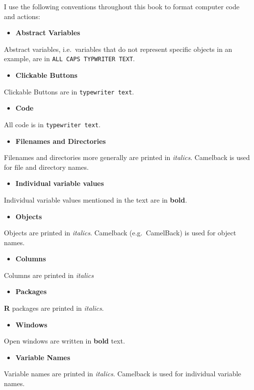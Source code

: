 I use the following conventions throughout this book to format computer
code and actions:

\begin{itemize}
\item
  \textbf{Abstract Variables}
\end{itemize}
Abstract variables, i.e.~variables that do not represent specific
objects in an example, are in \texttt{ALL CAPS TYPWRITER TEXT}.

\begin{itemize}
\item
  \textbf{Clickable Buttons}
\end{itemize}
Clickable Buttons are in \texttt{typewriter text}.

\begin{itemize}
\item
  \textbf{Code}
\end{itemize}
All code is in \texttt{typewriter text}.

\begin{itemize}
\item
  \textbf{Filenames and Directories}
\end{itemize}
Filenames and directories more generally are printed in \emph{italics}.
Camelback is used for file and directory names.

\begin{itemize}
\item
  \textbf{Individual variable values}
\end{itemize}
Individual variable values mentioned in the text are in \textbf{bold}.

\begin{itemize}
\item
  \textbf{Objects}
\end{itemize}
Objects are printed in \emph{italics}. Camelback (e.g.~CamelBack) is
used for object names.

\begin{itemize}
\item
  \textbf{Columns}
\end{itemize}
Columns are printed in \emph{italics}

\begin{itemize}
\item
  \textbf{Packages}
\end{itemize}
\textbf{R} packages are printed in \emph{italics}.

\begin{itemize}
\item
  \textbf{Windows}
\end{itemize}
Open windows are written in \textbf{bold} text.

\begin{itemize}
\item
  \textbf{Variable Names}
\end{itemize}
Variable names are printed in \emph{italics}. Camelback is used for
individual variable names.
